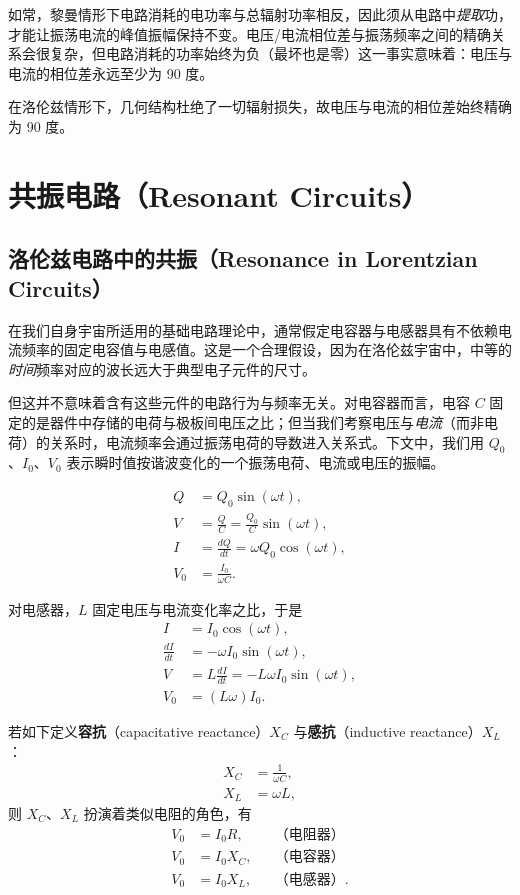 如常，黎曼情形下电路消耗的电功率与总辐射功率相反，因此须从电路中\emph{提取}功，才能让振荡电流的峰值振幅保持不变。电压/电流相位差与振荡频率之间的精确关系会很复杂，但电路消耗的功率始终为负（最坏也是零）这一事实意味着：电压与电流的相位差永远至少为 90 度。

在洛伦兹情形下，几何结构杜绝了一切辐射损失，故电压与电流的相位差始终精确为 90 度。

\section{共振电路（Resonant Circuits）}

\subsection{洛伦兹电路中的共振（Resonance in Lorentzian Circuits）}

在我们自身宇宙所适用的基础电路理论中，通常假定电容器与电感器具有不依赖电流频率的固定电容值与电感值。这是一个合理假设，因为在洛伦兹宇宙中，中等的\emph{时间}频率对应的波长远大于典型电子元件的尺寸。

但这并不意味着含有这些元件的电路行为与频率无关。对电容器而言，电容 $C$ 固定的是器件中存储的电荷与极板间电压之比；但当我们考察电压与\emph{电流}（而非电荷）的关系时，电流频率会通过振荡电荷的导数进入关系式。下文中，我们用 $Q_{0}$、$I_{0}$、$V_{0}$ 表示瞬时值按谐波变化的一个振荡电荷、电流或电压的振幅。

\begin{align}
Q &= Q_{0}\sin(\omega t),\\
V &= \frac{Q}{C} = \frac{Q_{0}}{C}\sin(\omega t),\\
I &= \frac{dQ}{dt} = \omega Q_{0}\cos(\omega t),\\
V_{0} &= \frac{I_{0}}{\omega C}.
\end{align}

对电感器，$L$ 固定电压与电流变化率之比，于是
\begin{align}
I &= I_{0}\cos(\omega t),\\
\frac{dI}{dt} &= -\omega I_{0}\sin(\omega t),\\
V &= L\frac{dI}{dt} = -L\omega I_{0}\sin(\omega t),\\
V_{0} &= (L\omega)I_{0}.
\end{align}

若如下定义\textbf{容抗}（capacitative reactance）$X_{C}$ 与\textbf{感抗}（inductive reactance）$X_{L}$：
\begin{align}
X_{C} &= \frac{1}{\omega C},\\
X_{L} &= \omega L,
\end{align}
则 $X_{C}$、$X_{L}$ 扮演着类似电阻的角色，有
\begin{align}
V_{0} &= I_{0}R, && \text{（电阻器）}\\
V_{0} &= I_{0}X_{C}, && \text{（电容器）}\\
V_{0} &= I_{0}X_{L}, && \text{（电感器）}.
\end{align}

